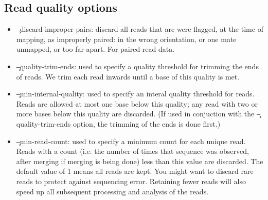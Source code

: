 \subsection{Read quality options}
\begin{itemize}
\item \c{--discard-improper-pairs}: discard all reads that are were flagged, at the time of mapping, as improperly paired: in the wrong orientation, or one mate unmapped, or too far apart.
For paired-read data.
\item \c{--quality-trim-ends}: used to specify a quality threshold for trimming the ends of reads.
We trim each read inwards until a base of this quality is met.
\item \c{--min-internal-quality}: used to specify an interal quality threshold for reads.
Reads are allowed at most one base below this quality; any read with two or more bases below this quality are discarded.
(If used in conjuction with the \c{--quality-trim-ends option}, the trimming of the ends is done first.)
\item \c{--min-read-count}: used to specify a minimum count for each unique read.
Reads with a count (i.e. the number of times that sequence was observed, after merging if merging is being done) less than this value are discarded.
The default value of 1 means all reads are kept.
You might want to discard rare reads to protect against sequencing error.
Retaining fewer reads will also speed up all subsequent processing and analysis of the reads.
\end{itemize}

